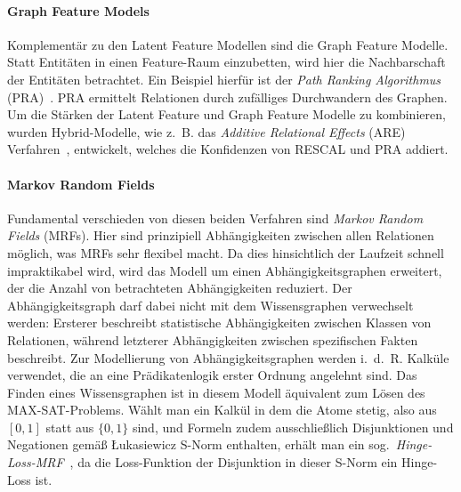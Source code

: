 \paragraph{Graph Feature Models}
Komplementär zu den Latent Feature Modellen sind die Graph Feature Modelle.
Statt Entitäten in einen Feature-Raum einzubetten, wird hier die Nachbarschaft der Entitäten betrachtet.
Ein Beispiel hierfür ist der \textit{Path Ranking Algorithmus} (PRA)~\cite{Lao2011}. PRA ermittelt Relationen durch zufälliges Durchwandern des Graphen.
Um die Stärken der Latent Feature und Graph Feature Modelle zu kombinieren, wurden Hybrid-Modelle, wie z.~B. das \textit{Additive Relational Effects} (ARE) Verfahren~\cite{Nickel2014}, entwickelt, welches die Konfidenzen von RESCAL und PRA addiert.

\paragraph{Markov Random Fields}
Fundamental verschieden von diesen beiden Verfahren sind \textit{Markov Random Fields} (MRFs).
Hier sind prinzipiell Abhängigkeiten zwischen allen Relationen möglich, was MRFs sehr flexibel macht.
Da dies hinsichtlich der Laufzeit schnell impraktikabel wird, wird das Modell um einen Abhängigkeitsgraphen erweitert, der die Anzahl von betrachteten Abhängigkeiten reduziert.
Der Abhängigkeitsgraph darf dabei nicht mit dem Wissensgraphen verwechselt werden:
Ersterer beschreibt statistische Abhängigkeiten zwischen Klassen von Relationen, während letzterer Abhängigkeiten zwischen spezifischen Fakten beschreibt.
Zur Modellierung von Abhängigkeitsgraphen werden i.~d.~R. Kalküle verwendet, die an eine Prädikatenlogik erster Ordnung angelehnt sind.
Das Finden eines Wissensgraphen ist in diesem Modell äquivalent zum Lösen des MAX-SAT-Problems.
Wählt man ein Kalkül in dem die Atome stetig, also aus $[0, 1]$ statt aus $\{ 0, 1 \}$ sind, und Formeln zudem ausschließlich Disjunktionen und Negationen gemäß Łukasiewicz S-Norm enthalten, erhält man ein sog.\ \textit{Hinge-Loss-MRF}~\cite{Bach2013}\cite{Bach2015}, da die Loss-Funktion der Disjunktion in dieser S-Norm ein Hinge-Loss ist.

